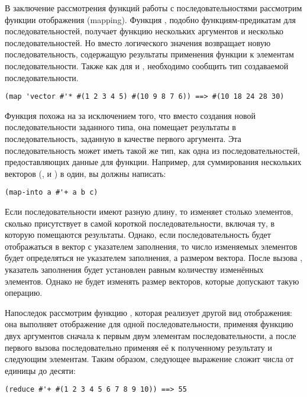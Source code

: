 В заключение рассмотрения функций работы с последовательностями рассмотрим
функции отображения (mapping).  Функция , подобно функциям-предикатам для
последовательностей, получает функцию нескольких аргументов и несколько
последовательностей.  Но вместо логического значения  возвращает новую
последовательность, содержащую результаты применения функции к элементам
последовательности.  Также как для  и , 
необходимо сообщить тип создаваемой последовательности.

\begin{lstlisting}[style=lisprepl]
  (map 'vector #'* #(1 2 3 4 5) #(10 9 8 7 6)) ==> #(10 18 24 28 30)
\end{lstlisting}

Функция  похожа на  за исключением того, что вместо создания
новой последовательности заданного типа, она помещает результаты в последовательность,
заданную в качестве первого аргумента.  Эта последовательность может иметь такой же тип,
как одна из последовательностей, предоставляющих данные для функции.  Например, для
суммирования нескольких векторов (,  и ) в один, вы должны
написать:

\begin{lstlisting}[style=lisprepl]
  (map-into a #'+ a b c)
\end{lstlisting}

Если последовательности имеют разную длину, то  изменяет столько элементов,
сколько присутствует в самой короткой последовательности, включая ту, в которую помещаются
результаты.  Однако, если последовательность будет отображаться в вектор с указателем
заполнения, то число изменяемых элементов будет определяться не указателем заполнения, а
размером вектора.  После вызова , указатель заполнения будет установлен
равным количеству изменённых элементов. Однако  не будет изменять размер
векторов, которые допускают такую операцию.

Напоследок рассмотрим функцию ,
которая реализует другой вид отображения: она выполняет отображение для
одной последовательности, применяя функцию двух аргументов сначала к первым двум элементам
последовательности, а после первого вызова последовательно применяя её к полученному
результату и следующим элементам.  Таким образом, следующее выражение сложит числа от
единицы до десяти:

\begin{lstlisting}[style=lisprepl]
  (reduce #'+ #(1 2 3 4 5 6 7 8 9 10)) ==> 55
\end{lstlisting}

